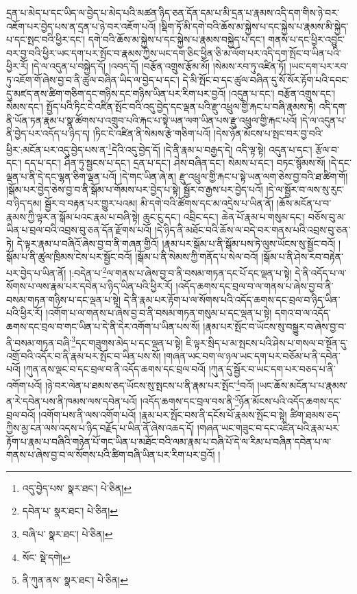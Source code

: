 དྲན་པ་མེད་པ་དང་ཡིད་ལ་བྱེད་པ་མེད་པའི་མཚན་ཉིད་ཅན་དོན་དམ་པ་མི་དྲན་པ་རྣམས་འདི་དག་གིས་ཉེ་བར་འཇོག་པར་བྱེད་པས་ན་དྲན་པ་ཉེ་བར་འཇོག་པའོ། །སྡིག་ཏོ་མི་དགེ་བའི་ཆོས་མ་སྐྱེས་པ་དང་སྐྱེས་པ་རྣམས་མི་སྐྱེད་པ་དང་སྤང་བའི་ཕྱིར་དང་། དགེ་བའི་ཆོས་མ་སྐྱེས་པ་དང་སྐྱེས་པ་རྣམས་བསྐྱེད་པ་དང་། གནས་པ་དང་ཕྱིར་འབྱུང་བར་བྱ་བའི་ཕྱིར་ཡང་དག་པར་སྤོང་བ་རྣམས་ཀྱིས་ཡང་དག་ཅིང་ཕྱིན་ཅི་མ་ལོག་པར་འདི་དག་སྤོང་བ་ཡིན་པའི་ཕྱིར་རོ། །དེ་ལ་འདུན་པ་བསྐྱེད་དོ། །འབད་དོ། །བརྩོན་འགྲུས་རྩོམ་མོ། །སེམས་རབ་ཏུ་འཛིན་ཏོ། །ཡང་དག་པར་རབ་ཏུ་འཇོག་གོ་ཞེས་བྱ་བ་ནི་ཚུལ་བཞིན་ཡིད་ལ་བྱེད་པ་དང་། དེ་མི་སྤོང་བ་དང་ཚུལ་བཞིན་དུ་སོ་སོར་རྟོག་པའི་དབང་དུ་མཛད་ནས་ཚིག་གཅིག་དང་གཉིས་དང་གཉིས་ཡིན་པར་རིག་པར་བྱའོ། །འདུན་པ་དང་། བརྩོན་འགྲུས་དང་། སེམས་དང་། སྤྱོད་པའི་ཏིང་ངེ་འཛིན་སྤོང་བའི་འདུ་བྱེད་དང་ལྡན་པའི་རྫུ་འཕྲུལ་གྱི་རྐང་པ་བཞི་རྣམས་ཏེ། འདི་དག་ནི་ཡོན་ཏན་རྣམ་པ་སྣ་ཚོགས་པ་འགྲུབ་པའི་རྐང་པ་སྟེ་ཡན་ལག་ཡིན་པས་རྫུ་འཕྲུལ་གྱི་རྐང་པའོ། །དེ་ལ་འདུན་པ་ནི་བྱེད་པར་འདོད་པ་ཉིད་ད། །ཏིང་ངེ་འཛིན་ནི་སེམས་རྩེ་གཅིག་པའོ། །དེས་ཉོན་མོངས་པ་སྤང་བར་བྱ་བའི་ཕྱིར་:མངོན་པར་འདུ་བྱེད་པས་ན་\footnote{འདུ་བྱེད་པས་  སྣར་ཐང་།  པེ་ཅིན། }དེའི་འདུ་བྱེད་དོ། །དེ་ནི་རྣམ་པ་བརྒྱད་དེ། འདི་ལྟ་སྟེ། འདུན་པ་དང་། རྩོལ་བ་དང་། དད་པ་དང་། ཤིན་ཏུ་སྦྱངས་པ་དང་། དྲན་པ་དང་། ཤེས་བཞིན་དང་། སེམས་པ་དང་། བཏང་སྙོམས་སོ། །དེ་དང་ལྡན་པ་ནི་དེ་དང་ལྷན་ཅིག་ལྡན་པའོ། །དེ་གང་ཡིན་ཞེ་ན། རྫུ་འཕྲུལ་གྱི་རྐང་པ་སྟེ་ཡན་ལག་ཅེས་བྱ་བའི་ཐ་ཚིག་གོ། །སྒོམ་པར་བྱེད་ཅེས་བྱ་བ་ནི་སྒོམ་པ་གོམས་པར་བྱེད་པ་སྟེ། སྦྱོར་བ་རྒྱས་པར་བྱེད་པའོ། །དེ་ལ་སྦྱོར་བ་ལས་སུ་རུང་བ་ཉིད་དམ། སྦྱོར་བ་བརྟན་པར་གྱུར་པའམ། མི་དགེ་བའི་ཚོགས་དང་མ་འདྲེས་པ་ཡིན་ནོ། །ཆོས་མངོན་པ་བ་རྣམས་ཀྱི་ལྟར་ན་སྒོམ་པའང་རྣམ་པ་བཞི་སྟེ། ཆུང་ངུ་དང་། འབྲིང་དང་། ཆེན་པོ་རྣམ་པ་གསུམ་དང་། བཅོས་བུ་མ་ཡིན་པ་བྲལ་བའི་འབྲས་བུ་ཅན་དོན་རྫོགས་པའོ། །དེ་ཉིད་ནི་མཐོང་བའི་ཆོས་ལ་བདེ་བར་གནས་པའི་འབྲས་བུ་ཅན་ཏེ། དེ་ལྟར་རྣམ་པ་བཞིའོ་ཞེས་བྱ་བ་ནི་གཞན་གྱིའོ། །རྣམ་པར་སྒོམ་པ་ནི་སྒོམ་པས་ཏེ་ལུས་ཡོངས་སུ་སྦྱོང་བའོ། །སྒོམ་པ་ནི་ཚུལ་ཁྲིམས་ངེས་པར་སྦྱོང་བའོ། །སྒོམ་པ་ནི་སེམས་ཀྱི་གནོད་པ་སེལ་བའོ། །སྒོམ་པ་ནི་ཤེས་རབ་བརྟེན་པར་བྱེད་པ་ཡིན་ནོ། །:བདེན་པ་\footnote{དབེན་པ་  སྣར་ཐང་།  པེ་ཅིན། }ལ་གནས་པ་ཞེས་བྱ་བ་ནི་བསམ་གཏན་དང་པོ་དང་ལྡན་པ་སྟེ། དེ་ནི་འདོད་པ་ལ་སོགས་པ་ལས་རྣམ་པར་དབེན་པ་ཉིད་ཡིན་པའི་ཕྱིར་རོ། །འདོད་ཆགས་དང་བྲལ་བ་ལ་གནས་པ་ཞེས་བྱ་བ་ནི་བསམ་གཏན་གཉིས་པ་དང་ལྡན་པ་སྟེ། དེ་ནི་རྣམ་པར་རྟོག་པ་ལ་སོགས་པའི་འདོད་ཆགས་དང་བྲལ་བ་ཉིད་ཡིན་པའི་ཕྱིར་རོ། །འགོག་པ་ལ་གནས་པ་ཞེས་བྱ་བ་ནི་བསམ་གཏན་གསུམ་པ་དང་ལྡན་པ་སྟེ། དགའ་བ་ལ་འདོད་ཆགས་དང་བྲལ་བ་གང་ཡིན་པ་དེ་ནི་དེར་འགོག་པ་ཡིན་པས་སོ། །རྣམ་པར་སྤོང་བ་ཡོངས་སུ་བསྒྱུར་བ་ཞེས་བྱ་བ་ནི་བསམ་གཏན་བཞི་\footnote{བཞི་པ་  སྣར་ཐང་།  པེ་ཅིན། }དང་གཟུགས་མེད་པ་དང་ལྡན་པ་སྟེ། ཇི་ལྟར་སྲིད་པ་མ་སྤངས་པའི་ཤེས་པ་གསལ་བ་སྔོན་དུ་འགྲོ་བའི་འདོར་བ་ནི་རྣམ་པར་སྤོང་བ་ཡིན་པས་སོ། །གཞན་ཡང་བག་ལ་ཉལ་ཡང་དག་པར་བཅོམ་པ་ནི་དབེན་པའོ། །ཀུན་ནས་ལྡང་བ་དང་བྲལ་བ་ནི་འདོད་ཆགས་དང་བྲལ་བའོ། །ཀུན་དུ་སྦྱོར་བ་ཡང་དག་པར་བཅད་པ་ནི་འགོག་པའོ། །ཉེ་བར་ལེན་པ་ཐམས་ཅད་ཡོངས་སུ་སྤངས་པ་ནི་རྣམ་པར་སྤོང་\footnote{སོང་  སྡེ་དགེ། }བའོ། །ཡང་ཆོས་མངོན་པ་པ་རྣམས་ན་རེ་དབེན་པས་ནི་ཁམས་ལས་དབེན་པའོ། །འདོད་ཆགས་དང་བྲལ་བས་ནི་\footnote{ནི་ཀུན་ནས་  སྣར་ཐང་།  པེ་ཅིན། }ཉོན་མོངས་པའི་འདོད་ཆགས་དང་བྲལ་བའོ། །འགོག་པས་ནི་ལས་འགོག་པའོ། །རྣམ་པར་སྤོང་བས་ནི་དངོས་པོ་རྣམས་སྤོང་བ་སྟེ། ཚིག་ཐམས་ཅད་ཀྱིས་མྱ་ངན་ལས་འདས་པ་ཉིད་བརྗོད་པ་ཡིན་ནོ་ཞེས་འཆད་དོ། །གཞན་ཡང་གཟུང་བ་དང་འཛིན་པའི་རྣམ་པར་རྟོག་པ་རྣམ་པ་བཞིའི་གཉེན་པོ་གང་ཡིན་པ་མཐོང་བའི་ལམ་རྣམ་པ་བཞི་པོ་དེ་ལ་རིམ་པ་བཞིན་དབེན་པ་ལ་གནས་པ་ཞེས་བྱ་བ་ལ་སོགས་པའི་ཚིག་བཞི་ཡིན་པར་རིག་པར་བྱའོ། །
